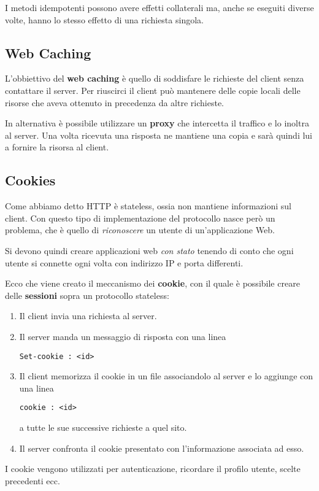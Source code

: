 I metodi idempotenti possono avere effetti collaterali ma, anche se 
eseguiti diverse volte, hanno lo stesso effetto di una richiesta 
singola.

\subsection{Web Caching}
L'obbiettivo del \textbf{web caching} è quello di soddisfare le 
richieste del client senza contattare il server. Per riuscirci il 
client può mantenere delle copie locali delle risorse che aveva 
ottenuto in precedenza da altre richieste.

In alternativa è possibile utilizzare un \textbf{proxy} che intercetta 
il traffico e lo inoltra al server. Una volta ricevuta una risposta ne 
mantiene una copia e sarà quindi lui a fornire la risorsa al client.

\subsection{Cookies}
Come abbiamo detto HTTP è stateless, ossia non mantiene informazioni 
sul client. Con questo tipo di implementazione del protocollo nasce 
però un problema, che è quello di \emph{riconoscere} un utente di 
un'applicazione Web.

Si devono quindi creare applicazioni web \emph{con stato} tenendo di 
conto che ogni utente si connette ogni volta con indirizzo IP e porta 
differenti.

Ecco che viene creato il meccanismo dei \textbf{cookie}, con il quale 
è possibile creare delle \textbf{sessioni} sopra un protocollo 
stateless:
\begin{enumerate}
	\item Il client invia una richiesta al server.
	\item Il server manda un messaggio di risposta con una linea
		\begin{center} \verb|Set-cookie : <id>| \end{center}
	\item Il client memorizza il cookie in un file associandolo al 
		server e lo aggiunge con una linea
		\begin{center}
			\verb|cookie : <id>|
		\end{center}
		a tutte le sue successive richieste a quel sito.
	\item Il server confronta il cookie presentato con l'informazione 
		associata ad esso.
\end{enumerate}
I cookie vengono utilizzati per autenticazione, ricordare il profilo 
utente, scelte precedenti ecc.

